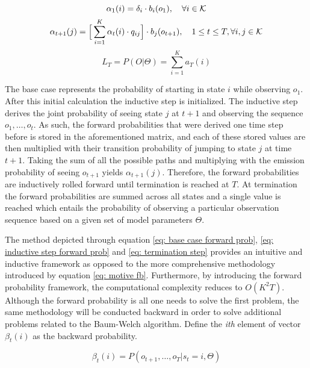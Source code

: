 \begin{equation}
    \alpha_1(i) = \delta_i\cdot b_i(o_1),
    \quad  \forall i \in \operatorname{\mathcal{K}}
    \label{eq: base case forward prob}
\end{equation}
\begin{equation}
    \alpha_{t+1}(j) = \Big[\sum_{i=1}^K \alpha_t(i)\cdot q_{ij}\Big] \cdot  b_j(o_{t+1}),
    \quad 1\leq t \leq T,
     \forall i,j \in \operatorname{\mathcal{K}}
    \label{eq: inductive step forward prob}
\end{equation}
\begin{equation}
    L_T = P(O|\Theta) = \sum_{i=1}^K a_T(i)
    \label{eq: termination step}
\end{equation}

The base case represents the probability of starting in state $i$ while observing $o_1$. After this initial calculation the inductive step is initialized. The inductive step derives the joint probability of seeing state $j$ at $t+1$ and observing the sequence $o_1,\ldots,o_t$. As such, the forward probabilities that were derived one time step before is stored in the aforementioned matrix, and each of these stored values are then multiplied with their transition probability of jumping to state $j$ at time $t+1$. Taking the sum of all the possible paths and multiplying with the emission probability of seeing $o_{t+1}$ yields $\alpha_{t+1}(j)$. Therefore, the forward probabilities are inductively rolled forward until termination is reached at $T$. At termination the forward probabilities are summed across all states and a single value is reached which entails the probability of observing a particular observation sequence based on a given set of model parameters $\Theta$.

The method depicted through equation \ref{eq: base case forward prob}, \ref{eq: inductive step forward prob} and \ref{eq: termination step} provides an intuitive and inductive framework as opposed to the more comprehensive methodology introduced by equation \ref{eq: motive fb}. Furthermore, by introducing the forward probability framework, the computational complexity reduces to $O(K^2T)$. Although the forward probability is all one needs to solve the first problem, the same methodology will be conducted backward in order to solve additional problems related to the Baum-Welch algorithm. Define the \textit{ith} element of vector $\beta_t(i)$ as the backward probability.

\begin{equation}
    \beta_t(i) = P(o_{t+1},\ldots,o_T | s_t = i, \Theta) 
\end{equation}

